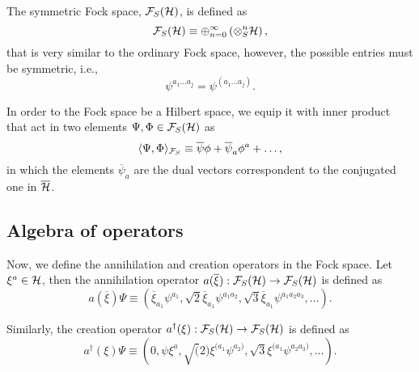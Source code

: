 The symmetric Fock space, \({\mathcal{F}}_S({\mathcal{H}})\), is defined as
\begin{equation}
    {\mathcal{F}}_S({\mathcal{H}})\equiv\oplus_{n=0}^{\infty}\left(\otimes^{n}_S{\mathcal{H}}\right),
\end{equation}
that is very similar to the ordinary Fock space, however, the possible entries must be symmetric, i.e.,
\begin{equation}
    \psi^{a_1\dots a_j}=\psi^{(a_1\dots a_j)}.
\end{equation}

In order to the Fock space be a Hilbert space, we equip it with inner product that act in two elements \(\Psi,\Phi\in{\mathcal{F}}_S({\mathcal{H}})\) as
\begin{equation}
    \langle\Psi,\Phi\rangle_{{\mathcal{F}}_S}\equiv\overline{\psi}\phi+\overline{\psi}_a\phi^a+\dots,
\end{equation}
in which the elements \(\overline{\psi}_a\) are the dual vectors correspondent to the conjugated one in \(\overline{{\mathcal{H}}}\).

\subsection*{Algebra of operators}
Now, we define the annihilation and creation operators in the Fock space. Let \(\xi^a\in{\mathcal{H}}\), then the annihilation operator \(a(\overline{\xi}):{\mathcal{F}}_S({\mathcal{H}})\to{\mathcal{F}}_S({\mathcal{H}})\) is defined as
\begin{equation}
    a(\overline{\xi})\Psi\equiv\left(\overline{\xi}_{a_1}\psi^{a_1},\sqrt{2}\overline{\xi}_{a_1}\psi^{a_1a_2},\sqrt{3}\overline{\xi}_{a_1}\psi^{a_1a_2a_3},\dots\right).
\end{equation}

Similarly, the creation operator \(a^{\dagger}(\xi):{\mathcal{F}}_S({\mathcal{H}})\to{\mathcal{F}}_S({\mathcal{H}})\) is defined as
\begin{equation}
    a^{\dagger}(\xi)\Psi\equiv\left(0,\psi\xi^a,\sqrt(2)\xi^{(a_1}\psi^{a_2)},\sqrt{3}\xi^{(a_1}\psi^{a_2a_3)},\dots\right).
\end{equation}

